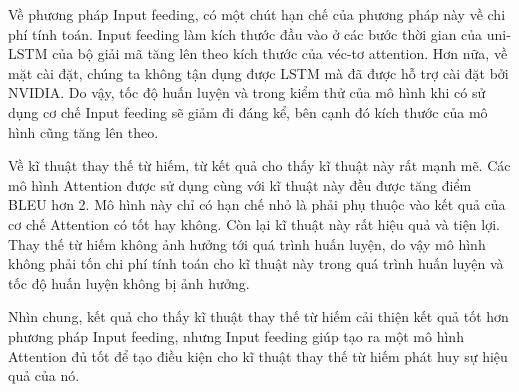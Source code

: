 Về phương pháp Input feeding, có một chút hạn chế của phương pháp này về chi phí tính toán. Input feeding làm kích thước đầu vào ở các bước thời gian của uni-LSTM của bộ giải mã tăng lên theo kích thước của véc-tơ attention. Hơn nữa, về mặt cài đặt, chúng ta không tận dụng được LSTM mà đã được hỗ trợ cài đặt bởi NVIDIA. Do vậy, tốc độ huấn luyện và trong kiểm thử của mô hình khi có sử dụng cơ chế Input feeding sẽ giảm đi đáng kể, bên cạnh đó kích thước của mô hình cũng tăng lên theo.

Về kĩ thuật thay thế từ hiếm, từ kết quả cho thấy kĩ thuật này rất mạnh mẽ. Các mô hình Attention được sử dụng cùng với kĩ thuật này đều được tăng điểm BLEU hơn 2. Mô hình này chỉ có hạn chế nhỏ là phải phụ thuộc vào kết quả của cơ chế Attention có tốt hay không. Còn lại kĩ thuật này rất hiệu quả và tiện lợi. Thay thế từ hiếm không ảnh hưởng tới quá trình huấn luyện, do vậy mô hình không phải tốn chi phí tính toán cho kĩ thuật này trong quá trình huấn luyện và tốc độ huấn luyện không bị ảnh hưởng. 

Nhìn chung, kết quả cho thấy kĩ thuật thay thế từ hiếm cải thiện kết quả tốt hơn phương pháp Input feeding, nhưng Input feeding giúp tạo ra một mô hình Attention đủ tốt để tạo điều kiện cho kĩ thuật thay thế từ hiếm phát huy sự hiệu quả của nó.

